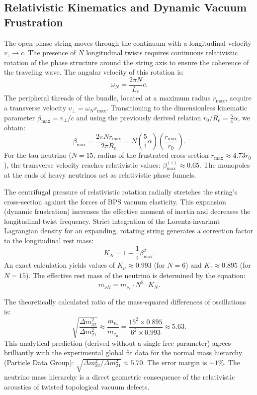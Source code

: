 \documentclass[12pt,a4paper]{article}
\begin{document}
\subsection{Relativistic Kinematics and Dynamic Vacuum Frustration}
The open phase string moves through the continuum with a longitudinal velocity $v_z \to c$. The presence of $N$ longitudinal twists requires continuous relativistic rotation of the phase structure around the string axis to ensure the coherence of the traveling wave. The angular velocity of this rotation is:
\begin{equation}
	\omega_N = \frac{2\pi N}{L_e} c.
\end{equation}
The peripheral threads of the bundle, located at a maximum radius $r_{\text{max}}$, acquire a transverse velocity $v_\perp = \omega_N r_{\text{max}}$. Transitioning to the dimensionless kinematic parameter $\beta_{\text{max}} = v_\perp / c$ and using the previously derived relation $r_0/R_e = \frac{5}{4}\alpha$, we obtain:
\begin{equation}
	\beta_{\text{max}} = \frac{2\pi N r_{\text{max}}}{2\pi R_e} = N \left( \frac{5}{4}\alpha \right) \left( \frac{r_{\text{max}}}{r_0} \right).
\end{equation}
For the tau neutrino ($N=15$, radius of the frustrated cross-section $r_{\text{max}} \approx 4.73 r_0$), the transverse velocity reaches relativistic values: $\beta_{\text{max}}^{(\tau)} \approx 0.65$. The monopoles at the ends of heavy neutrinos act as relativistic phase funnels.

The centrifugal pressure of relativistic rotation radially stretches the string's cross-section against the forces of BPS vacuum elasticity. This expansion (dynamic frustration) increases the effective moment of inertia and decreases the longitudinal twist frequency. Strict integration of the Lorentz-invariant Lagrangian density for an expanding, rotating string generates a correction factor to the longitudinal rest mass:
\begin{equation}
	K_N = 1 - \frac{1}{4} \beta_{\text{max}}^2.
\end{equation}
An exact calculation yields values of $K_\mu \approx 0.993$ (for $N=6$) and $K_\tau \approx 0.895$ (for $N=15$). The effective rest mass of the neutrino is determined by the equation:
\begin{equation}
	m_{\nu N} = m_{\nu_e} \cdot N^2 \cdot K_N.
\end{equation}

The theoretically calculated ratio of the mass-squared differences of oscillations is:
\begin{equation}
	\sqrt{\frac{\Delta m^2_{32}}{\Delta m^2_{21}}} \approx \frac{m_{\nu_\tau}}{m_{\nu_\mu}} = \frac{15^2 \times 0.895}{6^2 \times 0.993} \approx 5.63.
\end{equation}
This analytical prediction (derived without a single free parameter) agrees brilliantly with the experimental global fit data for the normal mass hierarchy (Particle Data Group): $\sqrt{\Delta m^2_{32} / \Delta m^2_{21}} \approx 5.70$. The error margin is $\sim 1\%$. 
The neutrino mass hierarchy is a direct geometric consequence of the relativistic acoustics of twisted topological vacuum defects.
\end{document}
